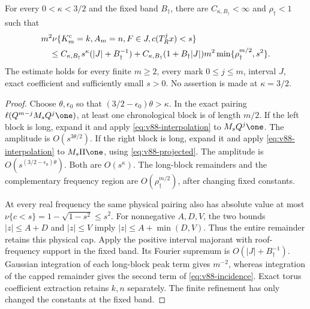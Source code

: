 \begin{theorem}
\label{thm:v88-incidence}
For every $0<\kappa<3/2$ and the fixed band $B_\dagger$, there
are $C_{\kappa,B_\dagger}<\infty$ and $\rho_\dagger<1$ such that
\begin{align}
 &m^2\nu\{K_m^{\rm c}=k,A_m=n,F\in J,c(T_R^j x)<s\}\notag\\
 &\quad\le C_{\kappa,B_\dagger}s^\kappa(|J|+B_\dagger^{-1})
  +C_{\kappa,B_\dagger}(1+B_\dagger|J|)m^2
                      \min\{\rho_\dagger^{m/2},s^2\}.
                                             \label{eq:v88-incidence}
\end{align}
The estimate holds for every finite $m\ge2$, every mark $0\le j\le m$,
interval $J$, exact coefficient and sufficiently small $s>0$.
No assertion is made at $\kappa=3/2$.
\end{theorem}
\begin{proof}
Choose $\theta,\epsilon_0$ so that
$(3/2-\epsilon_0)\theta>\kappa$. In the exact pairing
$\ell(Q^{m-j}M_sQ^j\one)$, at least one chronological block is
of length $m/2$. If the left block is long, expand it and apply
\eqref{eq:v88-interpolation} to $M_sQ^j\one$. The amplitude is
$O(s^{3\theta/2})$. If the right block is long, expand it and
apply \eqref{eq:v88-interpolation} to $M_s\Pi\one$, using
\eqref{eq:v88-projected}. The amplitude is
$O(s^{(3/2-\epsilon_0)\theta})$. Both are $O(s^\kappa)$.
The long-block remainders and the complementary frequency region are
$O(\rho_\dagger^{m/2})$, after changing fixed constants.

At every real frequency the same physical pairing also has absolute
value at most $\nu\{c<s\}=1-\sqrt{1-s^2}\le s^2$.
For nonnegative $A,D,V$, the two bounds $|z|\le A+D$ and
$|z|\le V$ imply $|z|\le A+\min(D,V)$. Thus the entire remainder
retains this physical cap. Apply the positive interval majorant with
roof-frequency support in the fixed band. Its Fourier supremum is
$O(|J|+B_\dagger^{-1})$. Gaussian integration of each long-block
peak term gives $m^{-2}$, whereas integration of the capped remainder
gives the second term of \eqref{eq:v88-incidence}. Exact torus
coefficient extraction retains $k,n$ separately. The finite refinement
has only changed the constants at the fixed band.
\end{proof}

